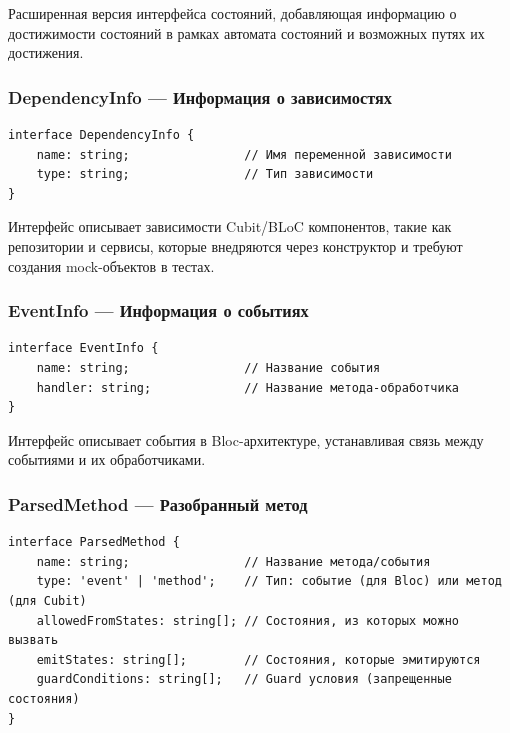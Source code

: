 \documentclass[14pt, russian]{scrartcl}
\begin{document}
Расширенная версия интерфейса состояний, добавляющая информацию о достижимости состояний в рамках автомата состояний и возможных путях их достижения.

\subsubsection{DependencyInfo — Информация о зависимостях}

\begin{verbatim}
interface DependencyInfo {
    name: string;                // Имя переменной зависимости
    type: string;                // Тип зависимости
}
\end{verbatim}

Интерфейс описывает зависимости Cubit/BLoC компонентов, такие как репозитории и сервисы, которые внедряются через конструктор и требуют создания mock-объектов в тестах.

\subsubsection{EventInfo — Информация о событиях}

\begin{verbatim}
interface EventInfo {
    name: string;                // Название события
    handler: string;             // Название метода-обработчика
}
\end{verbatim}

Интерфейс описывает события в Bloc-архитектуре, устанавливая связь между событиями и их обработчиками.

\subsubsection{ParsedMethod — Разобранный метод}

\begin{verbatim}
interface ParsedMethod {
    name: string;                // Название метода/события
    type: 'event' | 'method';    // Тип: событие (для Bloc) или метод (для Cubit)
    allowedFromStates: string[]; // Состояния, из которых можно вызвать
    emitStates: string[];        // Состояния, которые эмитируются
    guardConditions: string[];   // Guard условия (запрещенные состояния)
}
\end{verbatim}
\end{document}
